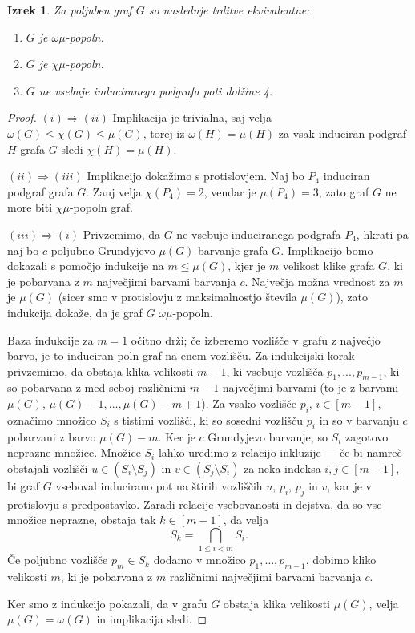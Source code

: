 \documentclass[12pt,a4paper,twoside]{article}
\theoremstyle{definition} %
\theoremstyle{plain} %
\newtheorem{izrek}[definicija]{Izrek}
\numberwithin{equation}{section}  %
\begin{document}
\begin{izrek}\label{grundyjevaKarakterizacija}
Za poljuben graf $G$ so naslednje trditve ekvivalentne:
\begin{enumerate}[label=(\roman*)]
\item $G$ je $\omega\mu$-popoln.
\item $G$ je $\chi\mu$-popoln.
\item $G$ ne vsebuje induciranega podgrafa poti dolžine 4.
\end{enumerate}
\end{izrek}

\begin{proof} $(i) \Rightarrow (ii)$ Implikacija je trivialna, saj velja $\omega(G) \leq \chi(G) \leq \mu(G)$, torej iz $\omega(H) = \mu(H)$ za vsak induciran podgraf $H$ grafa $G$ sledi $\chi(H) = \mu(H)$.

\medskip
$(ii) \Rightarrow (iii)$ Implikacijo dokažimo s protislovjem. Naj bo $P_4$ induciran podgraf grafa $G$. Zanj velja $\chi(P_4)=2$, vendar je $\mu(P_4) = 3$, zato graf $G$ ne more biti $\chi\mu$-popoln graf.

\medskip
$(iii) \Rightarrow (i)$ Privzemimo, da $G$ ne vsebuje induciranega podgrafa $P_4$, hkrati pa naj bo $c$ poljubno Grundyjevo $\mu(G)$-barvanje grafa $G$. Implikacijo bomo dokazali s pomočjo indukcije na $m \leq \mu(G)$, kjer je $m$ velikost klike grafa $G$, ki je pobarvana z $m$ največjimi barvami barvanja $c$. Največja možna vrednost za $m$ je $\mu(G)$ (sicer smo v protislovju z maksimalnostjo števila $\mu(G)$), zato indukcija dokaže, da je graf $G$ $\omega\mu$-popoln.

Baza indukcije za $m=1$ očitno drži; če izberemo vozlišče v grafu z največjo barvo, je to induciran poln graf na enem vozlišču. Za indukcijski korak privzemimo, da obstaja klika velikosti $m-1$, ki vsebuje vozlišča $p_1, ..., p_{m-1}$, ki so pobarvana z med seboj različnimi $m-1$ največjimi barvami (to je z barvami $\mu(G)$, $\mu(G) - 1, \dots, \mu(G) - m + 1$). Za vsako vozlišče $p_i$, $i \in [m-1]$, označimo množico $S_i$ s tistimi vozlišči, ki so sosedni vozlišču $p_i$ in so v barvanju $c$ pobarvani z barvo $\mu(G) - m$. Ker je $c$ Grundyjevo barvanje, so $S_i$ zagotovo neprazne množice. Množice $S_i$ lahko uredimo z relacijo inkluzije --- če bi namreč obstajali vozlišči $u \in (S_i \setminus S_j)$ in $v\in (S_j \setminus S_i)$ za neka indeksa $i,j \in [m-1]$, bi graf $G$ vseboval inducirano pot na štirih vozliščih $u$, $p_i$, $p_j$ in $v$, kar je v protislovju s predpostavko. Zaradi relacije vsebovanosti in dejstva, da so vse množice neprazne, obstaja tak $k \in [m-1]$, da velja $$S_k = \bigcap_{1 \leq i < m} S_i.$$ Če poljubno vozlišče $p_m \in S_k$ dodamo v množico $p_1, \dots, p_{m-1}$, dobimo kliko velikosti $m$, ki je pobarvana z $m$ različnimi največjimi barvami barvanja $c$.

Ker smo z indukcijo pokazali, da v grafu $G$ obstaja klika velikosti $\mu(G)$, velja $\mu(G) = \omega(G)$ in implikacija sledi.\end{proof}
\end{document}
